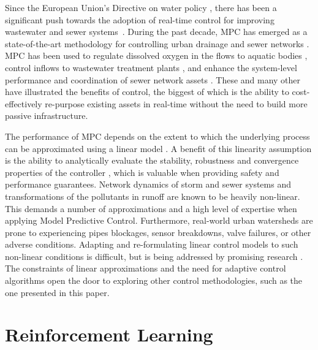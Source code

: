 Since the European Union’s Directive on water policy \cite{TheEuropeanParliamentandthecouncilofEuropeanUnion2000}, there has been a significant push towards the adoption of real-time control for improving wastewater and sewer systems~\cite{Schutze2004RealToday,Mollerup2016}.
During the past decade, MPC has emerged as a state-of-the-art methodology for  controlling urban drainage and sewer networks .
MPC has been used to regulate dissolved oxygen in the flows to aquatic bodies \cite{Mahmoodian2017Pollution-basedPropagation}, control inflows to wastewater treatment plants \cite{pleau2005global}, and enhance the system-level performance and coordination of sewer network assets \cite{Mollerup2016,Meneses2018CoordinatingDenmark}.
These and many other   \cite{wong2018real} have illustrated the benefits of control, the biggest of which is the ability to cost-effectively re-purpose existing assets in real-time without the need to build more passive infrastructure.

The performance of MPC depends on the extent to which the underlying process can be approximated using a linear model \cite{van2006model}.
A benefit of this linearity assumption is the ability to analytically evaluate the stability, robustness and convergence properties of the controller \cite{Ogata201}, which is valuable when providing safety and performance guarantees.
Network dynamics of storm and sewer systems and transformations of the pollutants in runoff are known to be heavily non-linear.
This demands a number of approximations and a high level of expertise when applying Model Predictive Control.
Furthermore, real-world urban watersheds are prone to experiencing pipes blockages, sensor breakdowns, valve failures, or other adverse conditions.
Adapting and re-formulating linear control models to such non-linear conditions is difficult, but is being addressed by promising research \cite{wong2018real}.
The constraints of linear approximations and the need for adaptive control algorithms open the door to exploring other control methodologies, such as the one presented in this paper.

\section{Reinforcement Learning}

